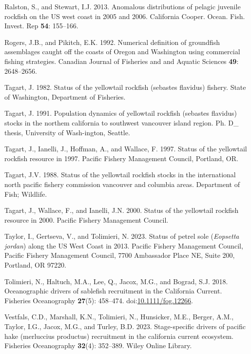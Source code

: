 \documentclass[
]{scrartcl}
\newlength{\cslhangindent}
\newenvironment{CSLReferences}[2] %
 {\begin{list}{}{%
  \setlength{\itemindent}{0pt}
  \setlength{\leftmargin}{0pt}
  \setlength{\parsep}{0pt}
  \ifodd #1
   \setlength{\leftmargin}{\cslhangindent}
   \setlength{\itemindent}{-1\cslhangindent}
  \fi
  \setlength{\itemsep}{#2\baselineskip}}}
 {\end{list}}
\begin{document}
\begin{CSLReferences}{1}{0}
Ralston, S., and Stewart, I.J. 2013. Anomalous distributions of pelagic
juvenile rockfish on the US west coast in 2005 and 2006. California
Cooper. Ocean. Fish. Invest. Rep \textbf{54}: 155--166.

Rogers, J.B., and Pikitch, E.K. 1992. {Numerical definition of
groundfish assemblages caught off the coasts of Oregon and Washington
using commercial fishing strategies}. Canadian Journal of Fisheries and
and Aquatic Sciences \textbf{49}: 2648--2656.

Tagart, J. 1982. Status of the yellowtail rockfish (sebastes flavidus)
fishery. State of Washington, Department of Fisheries.

Tagart, J. 1991. Population dynamics of yellowtail rockfish (sebastes
flavidus) stocks in the northem california to southwest vancouver island
region. Ph. D\_ thesis, University of Wash-ington, Seattle.

Tagart, J., Ianelli, J., Hoffman, A., and Wallace, F. 1997. Status of
the yellowtail rockfish resource in 1997. Pacific Fishery Management
Council, Portland, OR.

Tagart, J.V. 1988. Status of the yellowtail rockfish stocks in the
international north pacific fishery commission vancouver and columbia
areas. Department of Fish; Wildlife.

Tagart, J., Wallace, F., and Ianelli, J.N. 2000. Status of the
yellowtail rockfish resource in 2000. Pacific Fishery Management
Council.

Taylor, I., Gertseva, V., and Tolimieri, N. 2023. Status of petrel sole
(\emph{{Eopsetta} jordan}) along the {US} {West} {Coast} in 2013.
Pacific Fishery Management Council, Pacific Fishery Management Council,
7700 Ambassador Place NE, Suite 200, Portland, OR 97220.

Tolimieri, N., Haltuch, M.A., Lee, Q., Jacox, M.G., and Bograd, S.J.
2018. Oceanographic drivers of sablefish recruitment in the {California}
{Current}. Fisheries Oceanography \textbf{27}(5): 458--474.
doi:\href{https://doi.org/10.1111/fog.12266}{10.1111/fog.12266}.

Vestfals, C.D., Marshall, K.N., Tolimieri, N., Hunsicker, M.E., Berger,
A.M., Taylor, I.G., Jacox, M.G., and Turley, B.D. 2023. Stage-specific
drivers of pacific hake (merluccius productus) recruitment in the
california current ecosystem. Fisheries Oceanography \textbf{32}(4):
352--389. Wiley Online Library.


\end{CSLReferences}
\end{document}
